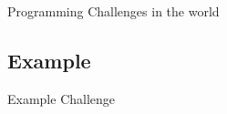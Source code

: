 \begin{frame}{Programming Challenges in the world}
\end{frame}

\subsection{Example}
\begin{frame}{Example Challenge}
\end{frame}

%
%
%
%
%
%
%
%
%
%
%
%



